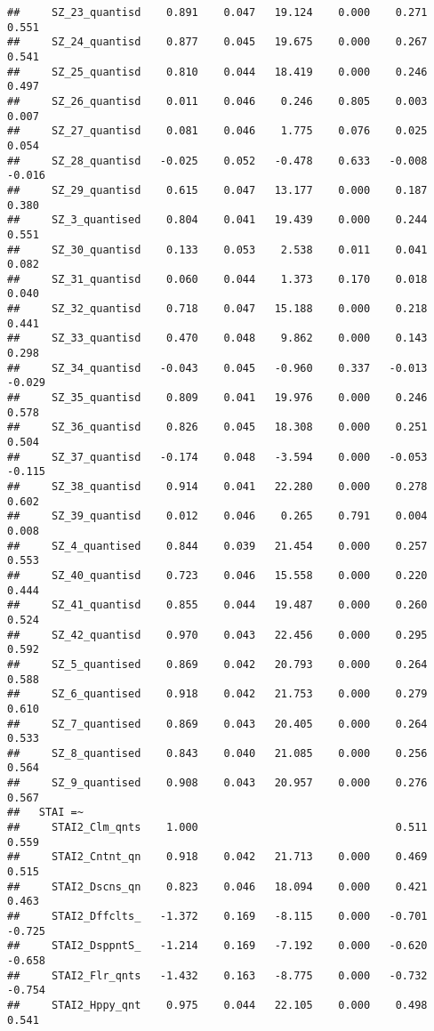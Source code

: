 \documentclass[]{article}
\begin{document}
\begin{verbatim}
##     SZ_23_quantisd    0.891    0.047   19.124    0.000    0.271    0.551
##     SZ_24_quantisd    0.877    0.045   19.675    0.000    0.267    0.541
##     SZ_25_quantisd    0.810    0.044   18.419    0.000    0.246    0.497
##     SZ_26_quantisd    0.011    0.046    0.246    0.805    0.003    0.007
##     SZ_27_quantisd    0.081    0.046    1.775    0.076    0.025    0.054
##     SZ_28_quantisd   -0.025    0.052   -0.478    0.633   -0.008   -0.016
##     SZ_29_quantisd    0.615    0.047   13.177    0.000    0.187    0.380
##     SZ_3_quantised    0.804    0.041   19.439    0.000    0.244    0.551
##     SZ_30_quantisd    0.133    0.053    2.538    0.011    0.041    0.082
##     SZ_31_quantisd    0.060    0.044    1.373    0.170    0.018    0.040
##     SZ_32_quantisd    0.718    0.047   15.188    0.000    0.218    0.441
##     SZ_33_quantisd    0.470    0.048    9.862    0.000    0.143    0.298
##     SZ_34_quantisd   -0.043    0.045   -0.960    0.337   -0.013   -0.029
##     SZ_35_quantisd    0.809    0.041   19.976    0.000    0.246    0.578
##     SZ_36_quantisd    0.826    0.045   18.308    0.000    0.251    0.504
##     SZ_37_quantisd   -0.174    0.048   -3.594    0.000   -0.053   -0.115
##     SZ_38_quantisd    0.914    0.041   22.280    0.000    0.278    0.602
##     SZ_39_quantisd    0.012    0.046    0.265    0.791    0.004    0.008
##     SZ_4_quantised    0.844    0.039   21.454    0.000    0.257    0.553
##     SZ_40_quantisd    0.723    0.046   15.558    0.000    0.220    0.444
##     SZ_41_quantisd    0.855    0.044   19.487    0.000    0.260    0.524
##     SZ_42_quantisd    0.970    0.043   22.456    0.000    0.295    0.592
##     SZ_5_quantised    0.869    0.042   20.793    0.000    0.264    0.588
##     SZ_6_quantised    0.918    0.042   21.753    0.000    0.279    0.610
##     SZ_7_quantised    0.869    0.043   20.405    0.000    0.264    0.533
##     SZ_8_quantised    0.843    0.040   21.085    0.000    0.256    0.564
##     SZ_9_quantised    0.908    0.043   20.957    0.000    0.276    0.567
##   STAI =~                                                               
##     STAI2_Clm_qnts    1.000                               0.511    0.559
##     STAI2_Cntnt_qn    0.918    0.042   21.713    0.000    0.469    0.515
##     STAI2_Dscns_qn    0.823    0.046   18.094    0.000    0.421    0.463
##     STAI2_Dffclts_   -1.372    0.169   -8.115    0.000   -0.701   -0.725
##     STAI2_DsppntS_   -1.214    0.169   -7.192    0.000   -0.620   -0.658
##     STAI2_Flr_qnts   -1.432    0.163   -8.775    0.000   -0.732   -0.754
##     STAI2_Hppy_qnt    0.975    0.044   22.105    0.000    0.498    0.541

\end{verbatim}
\end{document}
